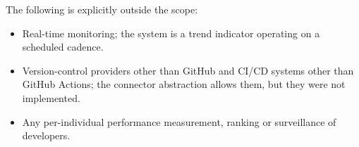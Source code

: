 The following is explicitly outside the scope:

\begin{itemize}
  \item Real-time monitoring; the system is a trend indicator operating on a
  scheduled cadence.
  \item Version-control providers other than GitHub and CI/CD systems other
  than GitHub Actions; the connector abstraction allows them, but they were
  not implemented.
  \item Any per-individual performance measurement, ranking or surveillance of
  developers.
\end{itemize}
